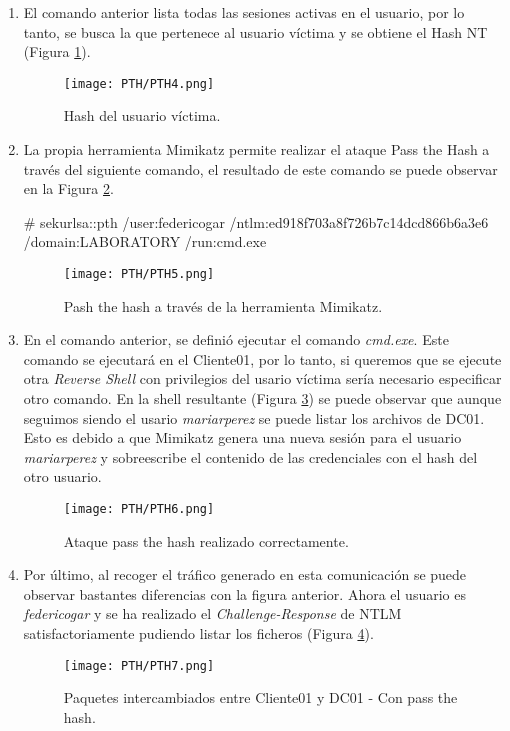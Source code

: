 \begin{enumerate}
\item El comando anterior lista todas las sesiones activas en el usuario, por lo tanto, se busca la que pertenece al usuario víctima y se obtiene el Hash NT (Figura \ref{PTH4}).
\begin{figure}[H] %
\begin{center}
\texttt{[image: PTH/PTH4.png]}
\end{center}
\caption{Hash del usuario víctima.}
\label{PTH4}
\end{figure}

\item La propia herramienta Mimikatz permite realizar el ataque Pass the Hash a través del siguiente comando, el resultado de este comando se puede observar en la Figura \ref{PTH5}.
\begin{listing}[style=consola, numbers=none]
# sekurlsa::pth /user:federicogar /ntlm:ed918f703a8f726b7c14dcd866b6a3e6 /domain:LABORATORY /run:cmd.exe
\end{listing}


\begin{figure}[H] %
\begin{center}
\texttt{[image: PTH/PTH5.png]}
\end{center}
\caption{Pash the hash a través de la herramienta Mimikatz.}
\label{PTH5}
\end{figure}

\item En el comando anterior, se definió ejecutar el comando {\it cmd.exe}. Este comando se ejecutará en el Cliente01, por lo tanto, si queremos que se ejecute otra {\it Reverse Shell} con privilegios del usario víctima sería necesario especificar otro comando. En la shell resultante (Figura \ref{PTH6}) se puede observar que aunque seguimos siendo el usario {\it mariarperez} se puede listar los archivos de DC01. Esto es debido a que Mimikatz genera una nueva sesión para el usuario {\it mariarperez} y sobreescribe el contenido de las credenciales con el hash del otro usuario. 
\begin{figure}[H] %
\begin{center}
\texttt{[image: PTH/PTH6.png]}
\end{center}
\caption{Ataque pass the hash realizado correctamente.}
\label{PTH6}
\end{figure}

\item Por último, al recoger el tráfico generado en esta comunicación se puede observar bastantes diferencias con la figura anterior. Ahora el usuario es {\it federicogar} y se ha realizado el {\it Challenge-Response} de NTLM satisfactoriamente pudiendo listar los ficheros (Figura \ref{PTH7}).
\begin{figure}[H] %
\begin{center}
\texttt{[image: PTH/PTH7.png]}
\end{center}
\caption{Paquetes intercambiados entre Cliente01 y DC01 - Con pass the hash.}
\label{PTH7}
\end{figure}


\end{enumerate}
